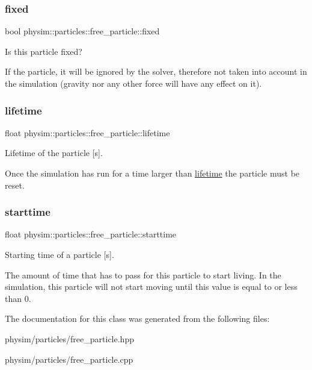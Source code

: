 \subsubsection{\texorpdfstring{fixed}{fixed}}
{\footnotesize\ttfamily bool physim\+::particles\+::free\+\_\+particle\+::fixed}



Is this particle fixed? 

If the particle, it will be ignored by the solver, therefore not taken into account in the simulation (gravity nor any other force will have any effect on it). \mbox{\label{classphysim_1_1particles_1_1free__particle_a5870d6fd3167d2c6120f887f45fe50fc}} 
\subsubsection{\texorpdfstring{lifetime}{lifetime}}
{\footnotesize\ttfamily float physim\+::particles\+::free\+\_\+particle\+::lifetime}



Lifetime of the particle \mbox{[}s\mbox{]}. 

Once the simulation has run for a time larger than \hyperlink{classphysim_1_1particles_1_1free__particle_a5870d6fd3167d2c6120f887f45fe50fc}{lifetime} the particle must be reset. \mbox{\label{classphysim_1_1particles_1_1free__particle_ad0379ba926ecc909bfbfb373045bfcf9}} 
\subsubsection{\texorpdfstring{starttime}{starttime}}
{\footnotesize\ttfamily float physim\+::particles\+::free\+\_\+particle\+::starttime}



Starting time of a particle \mbox{[}s\mbox{]}. 

The amount of time that has to pass for this particle to start \textquotesingle{}living\textquotesingle{}. In the simulation, this particle will not start moving until this value is equal to or less than 0. 

The documentation for this class was generated from the following files\+:\begin{DoxyCompactItemize}
\item 
physim/particles/free\+\_\+particle.\+hpp\item 
physim/particles/free\+\_\+particle.\+cpp\end{DoxyCompactItemize}
